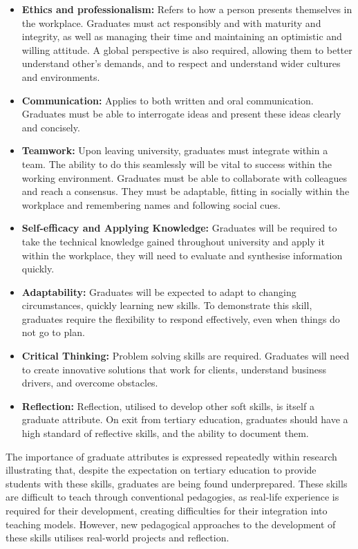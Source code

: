 \documentclass{l4proj}
\begin{document}
\begin{itemize}
    \item \textbf{Ethics and professionalism:} Refers to how a person presents themselves in the workplace. Graduates must act responsibly and with maturity and integrity, as well as managing their time and maintaining an optimistic and willing attitude. A global perspective is also required, allowing them to better understand other’s demands, and to respect and understand wider cultures and environments.
    \item \textbf{Communication:} Applies to both written and oral communication. Graduates must be able to interrogate ideas and present these ideas clearly and concisely.
    \item \textbf{Teamwork:} Upon leaving university, graduates must integrate within a team. The ability to do this seamlessly will be vital to success within the working environment. Graduates must be able to collaborate with colleagues and reach a consensus. They must be adaptable, fitting in socially within the workplace and remembering names and following social cues.
    \item \textbf{Self-efficacy and Applying Knowledge:} Graduates will be required to take the technical knowledge gained throughout university and apply it within the workplace, they will need to evaluate and synthesise information quickly.
    \item \textbf{Adaptability:} Graduates will be expected to adapt to changing circumstances, quickly learning new skills. To demonstrate this skill, graduates require the flexibility to respond effectively, even when things do not go to plan. 
    \item \textbf{Critical Thinking:} Problem solving skills are required. Graduates will need to create innovative solutions that work for clients, understand business drivers, and overcome obstacles.
    \item \textbf{Reflection:} Reflection, utilised to develop other soft skills, is itself a graduate attribute. On exit from tertiary education, graduates should have a high standard of reflective skills, and the ability to document them.
\end{itemize}

The importance of graduate attributes is expressed repeatedly within research illustrating that, despite the expectation on tertiary education to provide students with these skills, graduates are being found underprepared. These skills are difficult to teach through conventional pedagogies, as real-life experience is required for their development, creating difficulties for their integration into teaching models\citep{barr_2019}. However, new pedagogical approaches to the development of these skills utilises real-world projects and reflection.
 
\end{document}
